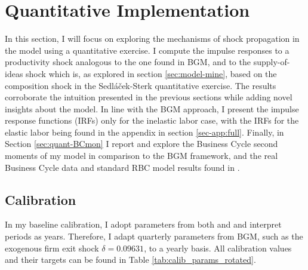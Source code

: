 \documentclass[a4paper,12pt]{article} %
\numberwithin{equation}{section} %
\numberwithin{figure}{section}
\numberwithin{table}{section}
\begin{document}
\section{Quantitative Implementation}
\label{sec:quant}

In this section, I will focus on exploring the mechanisms of shock propagation in the model using a quantitative exercise.
I compute the impulse responses to a productivity shock analogous to the one found in BGM, and to the supply-of-ideas shock which is,
as explored in section \ref{sec:model-mine}, based on the composition shock in the Sedláček-Sterk quantitative exercise. 
The results corroborate the intuition presented in the previous sections while adding novel insights about the model. In line with the 
BGM approach, I present the impulse response functions (IRFs) only for the inelastic labor case, with the IRFs for the elastic labor
being found in the appendix in section \ref{sec-app:full}. Finally, in Section \ref{sec:quant-BCmon} I report and explore the 
Business Cycle second moments of my model
in comparison to the BGM framework, and the real Business Cycle data and standard RBC model results found in 
\textcite{king1999resuscitating}.

\subsection{Calibration}
\label{sec:quant-cal} 

In my baseline calibration, I adopt parameters from both \textcite{bilbiie2012endogenous} and \textcite{sedlavcek2017growth} and
interpret periods as years. Therefore, I adapt quarterly parameters from BGM, such as the exogenous firm exit shock $\delta = 0.09631$, 
to a yearly basis. All calibration values and their targets can be found in Table \ref{tab:calib_params_rotated}.
\end{document}
